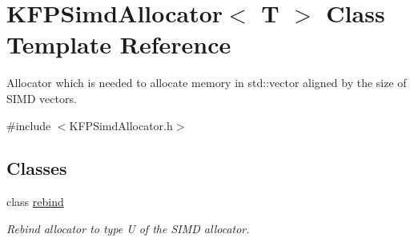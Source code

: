 \hypertarget{classKFPSimdAllocator}{}\section{K\+F\+P\+Simd\+Allocator$<$ T $>$ Class Template Reference}
\label{classKFPSimdAllocator}


Allocator which is needed to allocate memory in std\+::vector aligned by the size of S\+I\+MD vectors.  




{\ttfamily \#include $<$K\+F\+P\+Simd\+Allocator.\+h$>$}

\subsection*{Classes}
\begin{DoxyCompactItemize}
\item 
class \hyperlink{structKFPSimdAllocator_1_1rebind}{rebind}
\begin{DoxyCompactList}\small\item\em Rebind allocator to type U of the S\+I\+MD allocator. \end{DoxyCompactList}\end{DoxyCompactItemize}
